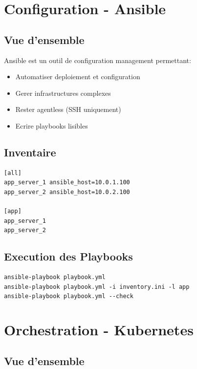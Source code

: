 \documentclass[12pt,a4paper]{report}
\begin{document}
\newpage

\chapter{Configuration - Ansible}

\section{Vue d'ensemble}

Ansible est un outil de configuration management permettant:
\begin{itemize}
    \item Automatiser deploiement et configuration
    \item Gerer infrastructures complexes
    \item Rester agentless (SSH uniquement)
    \item Ecrire playbooks lisibles
\end{itemize}

\section{Inventaire}

\begin{lstlisting}
[all]
app_server_1 ansible_host=10.0.1.100
app_server_2 ansible_host=10.0.2.100

[app]
app_server_1
app_server_2
\end{lstlisting}

\section{Execution des Playbooks}

\begin{lstlisting}
ansible-playbook playbook.yml
ansible-playbook playbook.yml -i inventory.ini -l app
ansible-playbook playbook.yml --check
\end{lstlisting}

\newpage

\chapter{Orchestration - Kubernetes}

\section{Vue d'ensemble}
\end{document}
